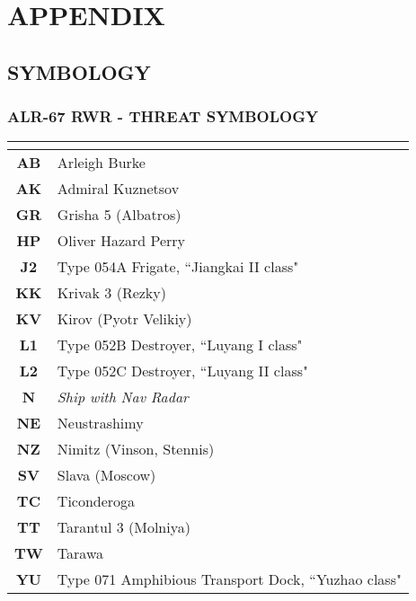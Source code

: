 \documentclass[fontSpartan]{TechCheck}
\begin{document}
	\chapter{APPENDIX}
	\minitoc
	\cleardoublepage

	\section{SYMBOLOGY}

	\subsection{ALR-67 RWR - THREAT SYMBOLOGY}
	\label{subsec:rwrsymb}
	\begin{multicols*}{2}
	\begin{center}
		\begin{tabular}{c | p{4cm} }
			\toprule
			\multicolumn{2}{c}{\blue{SHIPS}} \\
			\toprule
			\textbf{AB} & Arleigh Burke \\
			\midrule
			\textbf{AK} & Admiral Kuznetsov \\
			\midrule
			\textbf{GR} & Grisha 5 (Albatros) \\
			\midrule
			\textbf{HP} & Oliver Hazard Perry \\
			\midrule
			\textbf{J2} & Type 054A Frigate, ``Jiangkai II class" \\
			\midrule
			\textbf{KK} & Krivak 3 (Rezky) \\
			\midrule
			\textbf{KV} & Kirov (Pyotr Velikiy) \\
			\midrule
			\textbf{L1} & Type 052B Destroyer, ``Luyang I class" \\
			\midrule
			\textbf{L2} & Type 052C Destroyer, ``Luyang II class" \\
			\midrule
			\textbf{N} & \emph{Ship with Nav Radar} \\
			\midrule
			\textbf{NE} & Neustrashimy \\
			\midrule
			\textbf{NZ} & Nimitz (Vinson, Stennis) \\
			\midrule
			\textbf{SV} & Slava (Moscow) \\
			\midrule
			\textbf{TC} & Ticonderoga \\
			\midrule
			\textbf{TT} & Tarantul 3 (Molniya) \\
			\midrule
			\textbf{TW} & Tarawa \\
			\midrule
			\textbf{YU} & Type 071 Amphibious Transport Dock, ``Yuzhao class" \\

\end{tabular}
\end{center}
\end{multicols*}
\end{document}
